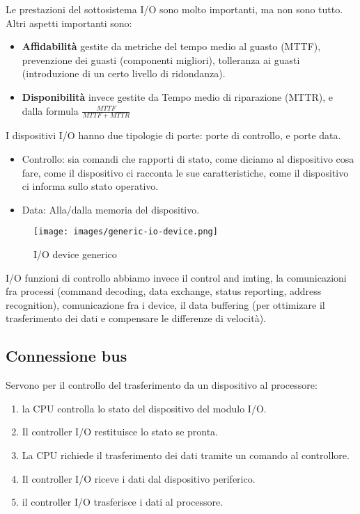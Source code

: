 \hspace{-15pt}
Le prestazioni del sottosistema I/O sono molto importanti, ma non sono tutto. Altri aspetti importanti sono:
\begin{itemize}
    \item \textbf{Affidabilità} gestite da metriche del tempo medio al guasto (MTTF), prevenzione dei guasti (componenti migliori), tolleranza ai guasti (introduzione di un certo livello di ridondanza).
    \item \textbf{Disponibilità} invece gestite da Tempo medio di riparazione (MTTR), e dalla formula \(\frac{MTTF}{MTTF + MTTR}\)
\end{itemize}

\hspace{-15pt}I dispositivi I/O hanno due tipologie di porte: porte di controllo, e porte data.
\begin{itemize}
    \item Controllo: sia comandi che rapporti di stato, come diciamo al dispositivo cosa fare, come il dispositivo ci racconta le sue caratteristiche, come il dispositivo ci informa sullo stato operativo.
    \item Data: Alla/dalla memoria del dispositivo.
\end{itemize}

\vspace{-10pt}
\begin{figure}[!h]
    \centering
    \texttt{[image: images/generic-io-device.png]}
    \caption{I/O device generico}
\end{figure}

\hspace{-15pt}I/O funzioni di controllo abbiamo invece il control and imting, la comunicazioni fra processi (command decoding, data exchange, status reporting, address recognition), comunicazione
fra i device, il data buffering (per ottimizare il trasferimento dei dati e compensare le differenze di velocità).

\subsection{Connessione bus}
Servono per il controllo del trasferimento da un dispositivo al processore:
\begin{enumerate}
    \item la CPU controlla lo stato del dispositivo del modulo I/O.
    \item Il controller I/O restituisce lo stato se pronta.
    \item La CPU richiede il trasferimento dei dati tramite un comando al controllore.
    \item Il controller I/O riceve i dati dal dispositivo periferico.
    \item il controller I/O trasferisce i dati al processore.
\end{enumerate}


